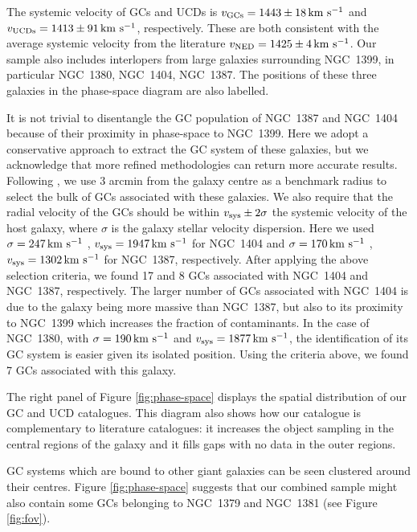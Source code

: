 \documentclass[useAMS,usenatbib]{mn2e}
\newcommand{\kms}{\mbox{\,km~s$^{-1}$}}
\begin{document}
The systemic velocity of GCs and UCDs is $v_{\rm GCs} = 1443 \pm 18 \kms$ and 
$v_{\rm UCDs} = 1413 \pm 91 \kms$, respectively. These are both consistent with 
the average systemic velocity from the literature $v_{\rm NED} = 1425 \pm 4 
\kms$. Our sample also includes interlopers from large galaxies surrounding 
NGC~1399, in particular NGC~1380, NGC~1404, NGC~1387. The positions of these 
three galaxies in the phase-space diagram are also labelled. 

It is not trivial to disentangle the GC population of NGC~1387 and NGC~1404 
because of their proximity in phase-space to NGC~1399. 
Here we adopt a conservative approach to extract the GC system of these 
galaxies, but we acknowledge that more refined methodologies can return more 
accurate results. Following \citet{Schuberth}, we use 3 arcmin from the galaxy 
centre as a benchmark radius to select the bulk of GCs associated with these 
galaxies. We also require that the radial velocity of the GCs should be within 
$v_{\rm sys} \pm 2\sigma$  the systemic velocity of the host galaxy, where 
$\sigma$ is the galaxy stellar velocity dispersion. Here we used $\sigma = 247 
\kms$  \citep{Vanderbeke11}, $v_{\rm sys} = 1947 \kms$ for NGC~1404 and $\sigma 
= 170 \kms$ \citep{Wegner03}, $v_{\rm sys} = 1302\kms $ for NGC~1387, 
respectively. After applying the above selection criteria, we found 17 and 8 
GCs associated with NGC~1404 and NGC~1387, respectively. The larger number of 
GCs associated with NGC~1404 is due to the galaxy being more massive than 
NGC~1387, but also to its proximity to NGC~1399 which increases the fraction of 
contaminants.
In the case of NGC~1380, with $\sigma = 190 \kms$  \citep{Vanderbeke11} and 
$v_{\rm sys} = 1877 \kms$, the identification of its GC system is easier given 
its isolated position. Using the criteria above, we found 7 GCs associated with 
this galaxy. 

The right panel of Figure \ref{fig:phase-space} displays the spatial 
distribution of our GC and UCD catalogues. This diagram also shows how our 
catalogue is complementary to literature catalogues: it increases the object 
sampling in the central regions of the galaxy and it fills gaps with no data in 
the outer regions. 

GC systems which are bound to other giant galaxies can be seen clustered around 
their centres. Figure \ref{fig:phase-space} suggests that our combined sample 
might also contain some GCs belonging to NGC~1379 and NGC~1381 (see Figure 
\ref{fig:fov}). 
\end{document}
